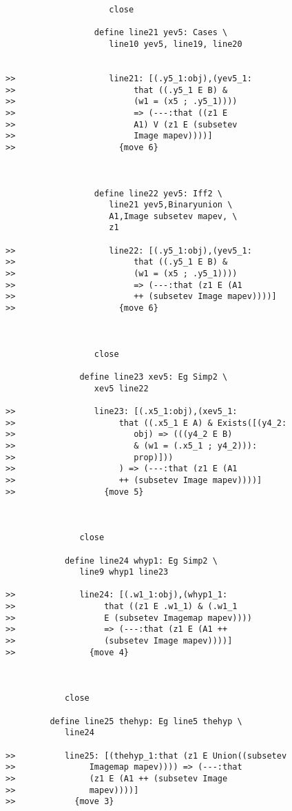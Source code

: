 \documentclass[12pt]{article}
\begin{document}
\begin{verbatim}
                     close

                  define line21 yev5: Cases \
                     line10 yev5, line19, line20


>>                   line21: [(.y5_1:obj),(yev5_1:
>>                        that ((.y5_1 E B) &
>>                        (w1 = (x5 ; .y5_1))))
>>                        => (---:that ((z1 E
>>                        A1) V (z1 E (subsetev
>>                        Image mapev))))]
>>                     {move 6}



                  define line22 yev5: Iff2 \
                     line21 yev5,Binaryunion \
                     A1,Image subsetev mapev, \
                     z1

>>                   line22: [(.y5_1:obj),(yev5_1:
>>                        that ((.y5_1 E B) &
>>                        (w1 = (x5 ; .y5_1))))
>>                        => (---:that (z1 E (A1
>>                        ++ (subsetev Image mapev))))]
>>                     {move 6}



                  close

               define line23 xev5: Eg Simp2 \
                  xev5 line22

>>                line23: [(.x5_1:obj),(xev5_1:
>>                     that ((.x5_1 E A) & Exists([(y4_2:
>>                        obj) => (((y4_2 E B)
>>                        & (w1 = (.x5_1 ; y4_2))):
>>                        prop)]))
>>                     ) => (---:that (z1 E (A1
>>                     ++ (subsetev Image mapev))))]
>>                  {move 5}



               close

            define line24 whyp1: Eg Simp2 \
               line9 whyp1 line23

>>             line24: [(.w1_1:obj),(whyp1_1:
>>                  that ((z1 E .w1_1) & (.w1_1
>>                  E (subsetev Imagemap mapev))))
>>                  => (---:that (z1 E (A1 ++
>>                  (subsetev Image mapev))))]
>>               {move 4}



            close

         define line25 thehyp: Eg line5 thehyp \
            line24

>>          line25: [(thehyp_1:that (z1 E Union((subsetev
>>               Imagemap mapev)))) => (---:that
>>               (z1 E (A1 ++ (subsetev Image
>>               mapev))))]
>>            {move 3}




\end{verbatim}
\end{document}
